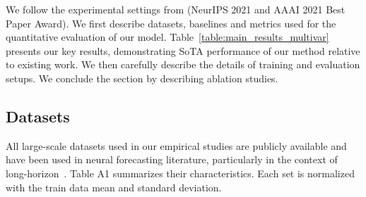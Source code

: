 We follow the experimental settings from \citep{wu2021autoformer, zhou2021informer} (NeurIPS 2021 and AAAI 2021 Best Paper Award). We first describe datasets, baselines and metrics used for the quantitative evaluation of our model. Table~\ref{table:main_results_multivar} presents our key results, demonstrating SoTA performance of our method relative to existing work. We then carefully describe the details of training and evaluation setups. We conclude the section by describing ablation studies.  %



\subsection{Datasets}
\label{section:datasets}

All large-scale datasets used in our empirical studies are publicly available and have been used in neural forecasting literature, particularly in the context of long-horizon~\citep{lai2018lstnet, zhou2019epf_heterogeneous_lstm, li2019logtrans, wu2021autoformer}. Table A1 summarizes their characteristics. Each set is normalized with the train data mean and standard deviation. 


